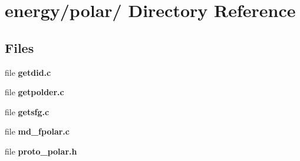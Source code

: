 \section{energy/polar/ Directory Reference}
\label{dir_df80a1687a99ac764a4a00537599b09b}
\subsection*{Files}
\begin{CompactItemize}
\item 
file {\bf getdid.c}
\item 
file {\bf getpolder.c}
\item 
file {\bf getsfg.c}
\item 
file {\bf md\_\-fpolar.c}
\item 
file {\bf proto\_\-polar.h}
\end{CompactItemize}
